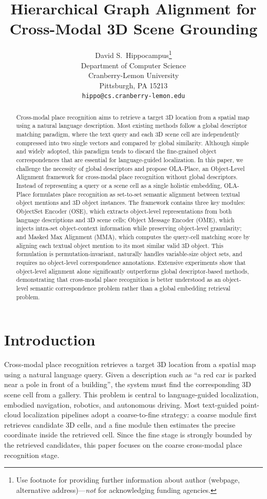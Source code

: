 \documentclass{article}
\title{Hierarchical Graph Alignment for Cross-Modal 3D Scene Grounding}
\author{%
  David S.~Hippocampus\thanks{Use footnote for providing further information
    about author (webpage, alternative address)---\emph{not} for acknowledging
    funding agencies.} \\
  Department of Computer Science\\
  Cranberry-Lemon University\\
  Pittsburgh, PA 15213 \\
  \texttt{hippo@cs.cranberry-lemon.edu} \\
}
\begin{document}
\maketitle

\begin{abstract}
Cross-modal place recognition aims to retrieve a target 3D location from a spatial map using a natural language description. Most existing methods follow a global descriptor matching paradigm, where the text query and each 3D scene cell are independently compressed into two single vectors and compared by global similarity. Although simple and widely adopted, this paradigm tends to discard the fine-grained object correspondences that are essential for language-guided localization. In this paper, we challenge the necessity of global descriptors and propose OLA-Place, an Object-Level Alignment framework for cross-modal place recognition without global descriptors. Instead of representing a query or a scene cell as a single holistic embedding, OLA-Place formulates place recognition as set-to-set semantic alignment between textual object mentions and 3D object instances. The framework contains three key modules: ObjectSet Encoder (OSE), which extracts object-level representations from both language descriptions and 3D scene cells; Object Message Encoder (OME), which injects intra-set object-context information while preserving object-level granularity; and Masked Max Alignment (MMA), which computes the query-cell matching score by aligning each textual object mention to its most similar valid 3D object. This formulation is permutation-invariant, naturally handles variable-size object sets, and requires no object-level correspondence annotations. Extensive experiments show that object-level alignment alone significantly outperforms global descriptor-based methods, demonstrating that cross-modal place recognition is better understood as an object-level semantic correspondence problem rather than a global embedding retrieval problem.
\end{abstract}

\section{Introduction}

Cross-modal place recognition retrieves a target 3D location from a spatial map using a natural language query. Given a description such as ``a red car is parked near a pole in front of a building'', the system must find the corresponding 3D scene cell from a gallery. This problem is central to language-guided localization, embodied navigation, robotics, and autonomous driving. Most text-guided point-cloud localization pipelines adopt a coarse-to-fine strategy: a coarse module first retrieves candidate 3D cells, and a fine module then estimates the precise coordinate inside the retrieved cell. Since the fine stage is strongly bounded by the retrieved candidates, this paper focuses on the coarse cross-modal place recognition stage.
\end{document}

